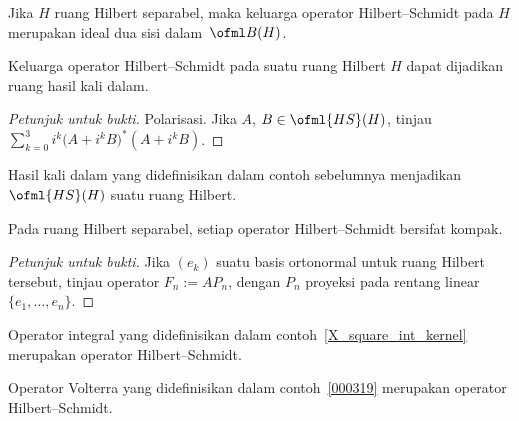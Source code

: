 \begin{prop} Jika $H$ ruang Hilbert separabel, maka keluarga operator Hilbert--Schmidt pada $H$ merupakan ideal
dua sisi dalam~$\ofml B(H)$.
\end{prop}

\begin{exam} Keluarga operator Hilbert--Schmidt pada suatu ruang Hilbert $H$ dapat dijadikan ruang hasil kali dalam.
\end{exam}

\begin{proof}[\emph{Petunjuk untuk bukti}] Polarisasi. Jika $A$, $B \in \ofml{HS}(H)$,
tinjau $\sum_{k=0}^3 i^k \bigl(A + i^kB\bigr)^*(A + i^kB)$. \ns
\end{proof}

\begin{exam} Hasil kali dalam yang didefinisikan dalam contoh sebelumnya menjadikan $\ofml{HS}(H)$ suatu ruang Hilbert.
\end{exam}

\begin{prop} Pada ruang Hilbert separabel, setiap operator Hilbert--Schmidt bersifat kompak.
\end{prop}

\begin{proof}[\emph{Petunjuk untuk bukti}] Jika $(e_k)$ suatu basis ortonormal untuk ruang Hilbert tersebut, tinjau
operator $F_n := AP_n$, dengan $P_n$ proyeksi pada rentang linear $\{e_1, \dots, e_n\}$. \ns
\end{proof}

\begin{exam} Operator integral yang didefinisikan dalam contoh~\ref{X_square_int_kernel} merupakan operator Hilbert--Schmidt.
\end{exam}

\begin{exam}
    Operator Volterra yang didefinisikan dalam contoh~\ref{000319} merupakan operator Hilbert--Schmidt.
\end{exam}











\endinput
